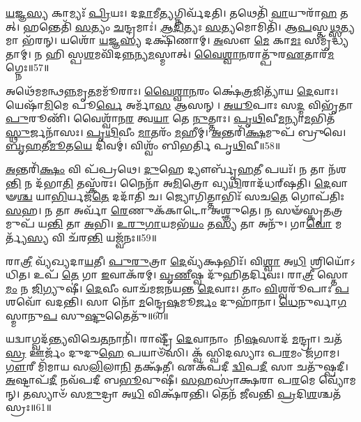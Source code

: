 \-\ul{𑌯}\-𑌜𑍍𑌞\-\ul{𑌸𑍍𑌯} 𑌕𑌾𑌮𑍍𑌯𑌃᳴ \ul{𑌪𑍍𑌰𑌿}\-𑌯𑌃।
𑌦\-\ul{𑌦𑌾}\-𑌮𑍀\-\ul{𑌤𑍍𑌯}\-𑌗𑍍𑌨𑌿𑌰𑍍𑌵᳴𑌦𑌤𑌿।
𑌤𑌥𑍇𑌤𑌿᳴ \ul{𑌵𑌾}\-𑌯𑍁𑌰𑌾᳴\-\ul{𑌹} 𑌤𑌤𑍍।
𑌹𑌨𑍍𑌤𑍇𑌤𑌿᳴ \ul{𑌸}\-𑌤𑍍𑌯𑌂 \ul{𑌚}\-𑌨𑍍𑌦𑍍𑌰𑌮𑌾𑌃॑।
\-\ul{𑌆}\-\-\ul{𑌦𑌿}\-𑌤𑍍𑌯𑌃 \ul{𑌸}\-𑌤𑍍𑌯𑌮𑍋𑌮𑌿𑌤𑌿᳴।
𑌆\-\ul{𑌪}\-𑌸𑍍𑌤\-\ul{𑌥𑍍𑌸}\-𑌤𑍍𑌯𑌮𑌾 𑌭᳴𑌰𑌨𑍍।
𑌯𑌶𑍋᳴ \ul{𑌯}\-𑌜𑍍𑌞\-\ul{𑌸𑍍𑌯} 𑌦𑌕𑍍𑌷𑌿᳴𑌣𑌾𑌮𑍍।
\-\ul{𑌅}\-𑌸𑍗 \ul{𑌮𑍇} 𑌕𑌾\-\ul{𑌮𑌃} 𑌸𑌮𑍃᳴𑌦𑍍𑌧𑍍𑌯𑌤𑌾𑌮𑍍।
𑌨 𑌹𑌿 𑌸𑍍𑌪\-\ul{𑌶}\-𑌮𑌵𑌿᳴𑌦\-\ul{𑌨𑍍𑌨}\-𑌨𑍍𑌯\-\ul{𑌮}\-𑌸𑍍𑌮𑌾𑌤𑍍।
\-\ul{𑌵𑍈}\-\-\ul{𑌶𑍍𑌵𑌾}\-\-\ul{𑌨}\-𑌰𑌾𑌤𑍍𑌪𑍁᳴𑌰\-\ul{𑌏}\-𑌤𑌾𑌰᳴\-\ul{𑌮}\-𑌗𑍍𑌨𑍇𑌃॥57॥

𑌅𑌥𑍇᳴𑌮𑌮𑌨𑍍𑌥\-\ul{𑌨𑍍𑌨}\-𑌮𑍃\-\ul{𑌤}\-𑌮𑌮𑍂᳴𑌰𑌾𑌃।
\-\ul{𑌵𑍈}\-\-\ul{𑌶𑍍𑌵𑌾}\-\-\ul{𑌨}\-𑌰𑌂 𑌕𑍍𑌷𑍇॑\-\ul{𑌤𑍍𑌰}\-𑌜𑌿𑌤𑍍𑌯𑌾᳴𑌯 \ul{𑌦𑍇}\-𑌵𑌾𑌃।
𑌯𑍇𑌷𑌾᳴\-\ul{𑌮𑌿}\-𑌮𑍇 𑌪𑍂\-\ul{𑌰𑍍𑌵𑍇} 𑌅𑌰𑍍𑌮𑌾᳴\-\ul{𑌸} 𑌆𑌸𑌨𑍍।
\-\ul{𑌅}\-\-\ul{𑌯𑍂}\-𑌪𑌾𑌃 𑌸\-\ul{𑌦𑍍𑌮} 𑌵𑌿𑌭𑍃᳴𑌤𑌾 \ul{𑌪𑍁}\-𑌰𑍂𑌣𑌿᳴।
𑌵𑍈𑌶𑍍𑌵𑌾᳴𑌨\-\ul{𑌰} 𑌤𑍍𑌵\-\ul{𑌯𑌾} 𑌤𑍇 \ul{𑌨𑍁}\-𑌤𑍍𑌤𑌾𑌃।
\-\ul{𑌪𑍃}\-\-\ul{𑌥𑌿}\-𑌵𑍀\-\ul{𑌮}\-𑌨𑍍𑌯𑌾\-\ul{𑌮}\-𑌭𑌿𑌤᳴\-\ul{𑌸𑍍𑌥𑍁}\-𑌰𑍍𑌜𑌨𑌾᳴𑌸𑌃।
\-\ul{𑌪𑍃}\-\-\ul{𑌥𑌿}\-𑌵𑍀𑌂 \ul{𑌮𑌾}\-𑌤𑌰𑌂᳴ \ul{𑌮}\-𑌹𑍀𑌮𑍍।
\-\ul{𑌅}\-𑌨𑍍𑌤𑌰𑌿᳴\-\ul{𑌕𑍍𑌷}\-𑌮𑍁𑌪᳴ 𑌬𑍍𑌰𑍁𑌵𑍇।
\-\ul{𑌬𑍃}\-\-\ul{𑌹}\-𑌤𑍀\-\ul{𑌮𑍂}\-𑌤\-\ul{𑌯𑍇} 𑌦𑌿𑌵𑌮𑍍॑।
𑌵𑌿𑌶𑍍𑌵𑌂᳴ 𑌬𑌿𑌭𑌰𑍍𑌤𑌿 𑌪𑍃\-\ul{𑌥𑌿}\-𑌵𑍀॥58॥

\-\ul{𑌅}\-𑌨𑍍𑌤𑌰𑌿᳴\-\ul{𑌕𑍍𑌷𑌂} 𑌵𑌿 𑌪᳴𑌪𑍍𑌰𑌥𑍇।
\-\ul{𑌦𑍁}\-𑌹𑍇 𑌦𑍍𑌯𑍗𑌰𑍍𑌬𑍃᳴\-\ul{𑌹}\-𑌤𑍀 𑌪𑌯𑌃᳴।
𑌨 𑌤𑌾 𑌨᳴𑌶\-\ul{𑌨𑍍𑌤𑌿} 𑌨 𑌦᳴𑌭𑌾\-\ul{𑌤𑌿} 𑌤𑌸𑍍𑌕᳴𑌰𑌃।
𑌨𑍈𑌨𑌾᳴ 𑌅\-\ul{𑌮𑌿}\-𑌤𑍍𑌰𑍋 𑌵𑍍𑌯\-\ul{𑌥𑌿}\-𑌰𑌾𑌦᳴𑌧𑌰𑍍‌\mbox{}𑌷𑌤𑌿।
\-\ul{𑌦𑍇}\-𑌵𑌾𑍟\-\ul{𑌶𑍍𑌚} 𑌯𑌾\-\ul{𑌭𑌿}\-𑌰𑍍𑌯𑌜᳴\-\ul{𑌤𑍇} 𑌦𑌦𑌾᳴𑌤𑌿 𑌚।
𑌜𑍍𑌯𑍋𑌗𑌿𑌤𑍍𑌤𑌾𑌭𑌿𑌃᳴ 𑌸𑌚\-\ul{𑌤𑍇} 𑌗𑍋𑌪᳴𑌤𑌿𑌃 \ul{𑌸}\-𑌹।
𑌨 𑌤𑌾 𑌅𑌰𑍍𑌵𑌾᳴ \ul{𑌰𑍇}\-𑌣𑍁𑌕᳴𑌕𑌾𑌟𑍋 𑌅𑌶𑍍𑌞𑍁𑌤𑍇।
𑌨 𑌸𑍟᳴𑌸𑍍𑌕𑍃\-\ul{𑌤}\-𑌤𑍍𑌰𑌮𑍁𑌪᳴ 𑌯\-\ul{𑌨𑍍𑌤𑌿} 𑌤𑌾 \ul{𑌅}\-𑌭𑌿।
\-\ul{𑌉}\-\-\ul{𑌰𑍁}\-\-\ul{𑌗𑌾}\-𑌯𑌮𑌭᳴\-\ul{𑌯𑌂} 𑌤\-\ul{𑌸𑍍𑌯} 𑌤𑌾 𑌅𑌨𑍁᳴।
𑌗𑌾\-\ul{𑌵𑍋} 𑌮𑌰𑍍𑌤𑍍𑌯᳴\-\ul{𑌸𑍍𑌯} 𑌵𑌿 𑌚᳴𑌰\-\ul{𑌨𑍍𑌤𑌿} 𑌯𑌜𑍍𑌵᳴𑌨𑌃॥59॥

𑌰𑌾\-\ul{𑌤𑍍𑌰𑍀} 𑌵𑍍𑌯᳴𑌖𑍍𑌯𑌦𑌾\-\ul{𑌯}\-𑌤𑍀।
\-\ul{𑌪𑍁}\-\-\ul{𑌰𑍁}\-𑌤𑍍𑌰𑌾 \ul{𑌦𑍇}\-𑌵𑍍𑌯᳴𑌕𑍍𑌷𑌭𑌿𑌃᳴।
𑌵𑌿\-\ul{𑌶𑍍𑌵𑌾} 𑌅\-\ul{𑌧𑌿} 𑌶𑍍𑌰𑌿𑌯𑍋᳴𑌽𑌧𑌿𑌤।
𑌉𑌪᳴ \ul{𑌤𑍇} 𑌗𑌾 \ul{𑌇}\-𑌵𑌾𑌕᳴𑌰𑌮𑍍।
\-\ul{𑌵𑍃}\-\-\ul{𑌣𑍀}\-𑌷𑍍𑌵 𑌦𑍁᳴𑌹𑌿𑌤𑌰𑍍𑌦𑌿𑌵𑌃।
𑌰𑌾\-\ul{𑌤𑍍𑌰𑍀} 𑌸𑍍𑌤𑍋\-\ul{𑌮𑌂} 𑌨 \ul{𑌜𑌿}\-𑌗𑍍𑌯𑍁𑌷𑍀॑।
\-\ul{𑌦𑍇}\-𑌵𑍀𑌂 𑌵𑌾𑌚᳴𑌮𑌜𑌨𑌯𑌨𑍍𑌤 \ul{𑌦𑍇}\-𑌵𑌾𑌃।
𑌤𑌾𑌂 \ul{𑌵𑌿}\-𑌶𑍍𑌵𑌰𑍂᳴𑌪𑌾𑌃 \ul{𑌪}\-𑌶𑌵𑍋᳴ 𑌵𑌦𑌨𑍍𑌤𑌿।
𑌸𑌾 𑌨𑍋᳴ \ul{𑌮}\-𑌨𑍍𑌦𑍍𑌰𑍇\-\ul{𑌷}\-𑌮𑍂\-\ul{𑌰𑍍𑌜𑌂} 𑌦𑍁𑌹𑌾᳴𑌨𑌾।
\-\ul{𑌧𑍇}\-𑌨𑍁𑌰𑍍𑌵𑌾\-\ul{𑌗}\-𑌸𑍍𑌮𑌾𑌨𑍁\-\ul{𑌪} 𑌸𑍁\-\ul{𑌷𑍍𑌟𑍁}\-𑌤𑍈𑌤𑍁᳴॥60॥

𑌯𑌦𑍍𑌵𑌾𑌗𑍍𑌵𑌦᳴𑌨𑍍𑌤𑍍𑌯𑌵𑌿𑌚𑍇\-\ul{𑌤}\-𑌨𑌾𑌨𑌿᳴।
𑌰𑌾𑌷𑍍𑌟𑍍𑌰𑍀᳴ \ul{𑌦𑍇}\-𑌵𑌾𑌨𑌾𑌂 𑌨𑌿\-\ul{𑌷}\-𑌸𑌾𑌦᳴ \ul{𑌮}\-𑌨𑍍𑌦𑍍𑌰𑌾।
𑌚𑌤᳴\-\ul{𑌸𑍍𑌰} 𑌊𑌰𑍍𑌜𑌂᳴ 𑌦𑍁𑌦𑍁\-\ul{𑌹𑍇} 𑌪𑌯𑌾𑍞᳴𑌸𑌿।
𑌕𑍍𑌵᳴ 𑌸𑍍𑌵𑌿𑌦𑌸𑍍𑌯𑌾𑌃 𑌪\-\ul{𑌰}\-𑌮𑌂 𑌜᳴𑌗𑌾𑌮।
\-\ul{𑌗𑍗}\-𑌰𑍀 𑌮𑌿᳴𑌮𑌾𑌯 𑌸\-\ul{𑌲𑌿}\-𑌲𑌾\-\ul{𑌨𑌿} 𑌤𑌕𑍍𑌷᳴𑌤𑍀।
𑌏𑌕᳴𑌪𑌦𑍀 \ul{𑌦𑍍𑌵𑌿}\-𑌪\-\ul{𑌦𑍀} 𑌸𑌾 𑌚𑌤𑍁᳴𑌷𑍍𑌪𑌦𑍀।
\-\ul{𑌅}\-𑌷𑍍𑌟𑌾𑌪᳴\-\ul{𑌦𑍀} 𑌨𑌵᳴𑌪𑌦𑍀 𑌬\-\ul{𑌭𑍂}\-𑌵𑍁𑌷𑍀॑।
\-\ul{𑌸}\-𑌹𑌸𑍍𑌰𑌾॑𑌕𑍍𑌷𑌰𑌾 𑌪\-\ul{𑌰}\-𑌮𑍇 𑌵𑍍𑌯𑍋᳴𑌮𑌨𑍍।
𑌤𑌸𑍍𑌯𑌾𑍞᳴ 𑌸\-\ul{𑌮𑍁}\-𑌦𑍍𑌰𑌾 𑌅\-\ul{𑌧𑌿} 𑌵𑌿𑌕𑍍𑌷᳴𑌰𑌨𑍍𑌤𑌿।
𑌤𑍇𑌨᳴ 𑌜𑍀𑌵𑌨𑍍𑌤𑌿 \ul{𑌪𑍍𑌰}\-𑌦𑌿\-\ul{𑌶}\-𑌶𑍍𑌚𑌤᳴𑌸𑍍𑌰𑌃॥61॥

